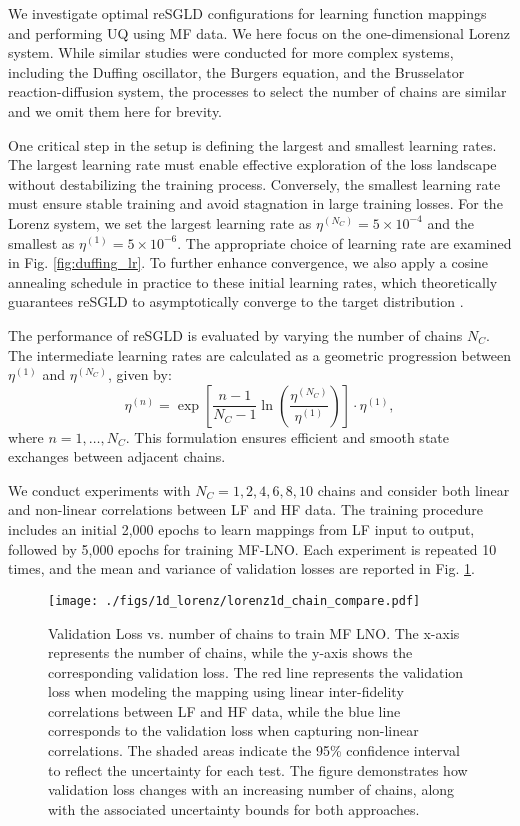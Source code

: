 We investigate optimal reSGLD configurations for learning function mappings and performing UQ using MF data. We here focus on the one-dimensional Lorenz system. While similar studies were conducted for more complex systems, including the Duffing oscillator, the Burgers equation, and the Brusselator reaction-diffusion system, the processes to select the number of chains are similar and we omit them here for brevity. 

One critical step in the setup is defining the largest and smallest learning rates. The largest learning rate must enable effective exploration of the loss landscape without destabilizing the training process. Conversely, the smallest learning rate must ensure stable training and avoid stagnation in large training losses. For the Lorenz system, we set the largest learning rate as $\eta^{(N_C)}=5 \times 10^{-4}$ and the smallest as $\eta^{(1)}=5 \times 10^{-6}$. The appropriate choice of learning rate are examined in Fig. \ref{fig:duffing_lr}. To further enhance convergence, we also apply a cosine annealing schedule in practice to these initial learning rates, which theoretically guarantees reSGLD to asymptotically converge to the target distribution \citep{welling2011bayesian}. 

The performance of reSGLD is evaluated by varying the number of chains $N_C$. The intermediate learning rates are calculated as a geometric progression between $\eta^{(1)}$ and $\eta^{(N_C)}$, given by:
\begin{equation*}
\eta^{(n)} = \exp\left[\frac{n-1}{N_C-1} \ln\left(\frac{\eta^{(N_C)}}{\eta^{(1)}}\right)\right] \cdot \eta^{(1)},
\end{equation*}
where $n = 1, \ldots, N_C$. This formulation ensures efficient and smooth state exchanges between adjacent chains.

We conduct experiments with $N_C = 1, 2, 4, 6, 8, 10$ chains and consider both linear and non-linear correlations between LF and HF data. The training procedure includes an initial 2,000 epochs to learn mappings from LF input to output, followed by 5,000 epochs for training MF-LNO. Each experiment is repeated 10 times, and the mean and variance of validation losses are reported in Fig. \ref{fig:ablation_chains}.

\begin{figure}
    \centering
    \texttt{[image: ./figs/1d\_lorenz/lorenz1d\_chain\_compare.pdf]}
    \caption{Validation Loss vs. number of chains to train MF LNO. The x-axis represents the number of chains, while the y-axis shows the corresponding validation loss. The red line represents the validation loss when modeling the mapping using linear inter-fidelity correlations between LF and HF data, while the blue line corresponds to the validation loss when capturing non-linear correlations. The shaded areas indicate the 95\% confidence interval to reflect the uncertainty for each test. The figure demonstrates how validation loss changes with an increasing number of chains, along with the associated uncertainty bounds for both approaches.}
    \label{fig:ablation_chains}
\end{figure}

